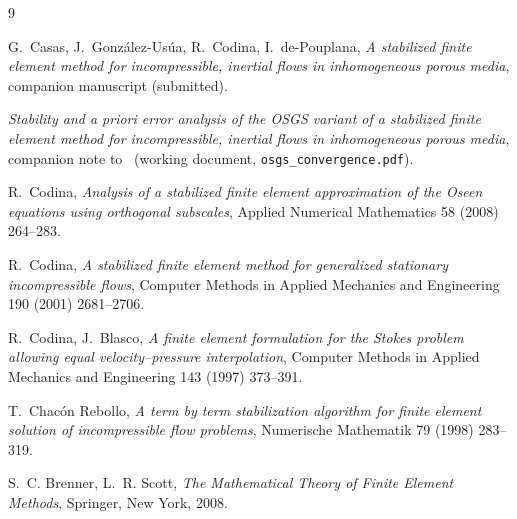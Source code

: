 \documentclass[11pt]{article}
\theoremstyle{remark}
\begin{document}
\begin{thebibliography}{9}

G.~Casas, J.~Gonz\'alez-Us\'ua, R.~Codina, I.~de-Pouplana,
\emph{A stabilized finite element method for incompressible, inertial flows in
inhomogeneous porous media}, companion manuscript (submitted).

\emph{Stability and a priori error analysis of the OSGS variant of a stabilized
finite element method for incompressible, inertial flows in inhomogeneous porous
media}, companion note to~\cite{companion} (working document,
\texttt{osgs\_convergence.pdf}).

R.~Codina,
\emph{Analysis of a stabilized finite element approximation of the Oseen equations
using orthogonal subscales},
Applied Numerical Mathematics 58 (2008) 264--283.

R.~Codina,
\emph{A stabilized finite element method for generalized stationary incompressible
flows},
Computer Methods in Applied Mechanics and Engineering 190 (2001) 2681--2706.

R.~Codina, J.~Blasco,
\emph{A finite element formulation for the Stokes problem allowing equal
velocity--pressure interpolation},
Computer Methods in Applied Mechanics and Engineering 143 (1997) 373--391.

T.~Chac\'on Rebollo,
\emph{A term by term stabilization algorithm for finite element solution of
incompressible flow problems},
Numerische Mathematik 79 (1998) 283--319.

S.~C. Brenner, L.~R. Scott,
\emph{The Mathematical Theory of Finite Element Methods},
Springer, New York, 2008.

\end{thebibliography}
\end{document}
